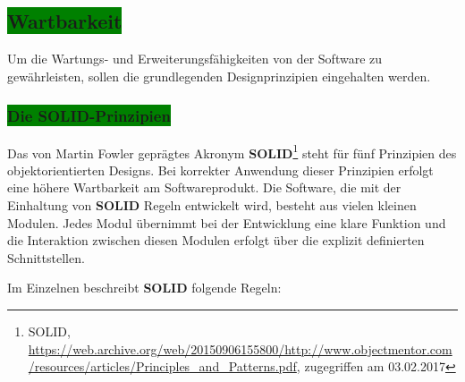 \subsection{\colorbox{green}{Wartbarkeit}}\label{maintenance}

Um die Wartungs- und Erweiterungsfähigkeiten von der Software zu gewährleisten, sollen die grundlegenden Designprinzipien eingehalten werden.

\subsubsection{\colorbox{green}{Die SOLID-Prinzipien}}\label{solid}

Das von Martin Fowler geprägtes Akronym \textbf{SOLID}\footnote{SOLID, \url{https://web.archive.org/web/20150906155800/http://www.objectmentor.com/resources/articles/Principles_and_Patterns.pdf}, zugegriffen am 03.02.2017} steht für fünf Prinzipien des objektorientierten Designs. Bei korrekter Anwendung dieser Prinzipien erfolgt eine höhere Wartbarkeit am Softwareprodukt. Die Software, die mit der Einhaltung von \textbf{SOLID} Regeln entwickelt wird, besteht aus vielen kleinen Modulen. Jedes Modul übernimmt bei der Entwicklung eine klare Funktion und die Interaktion zwischen diesen Modulen erfolgt über die explizit definierten Schnittstellen.

Im Einzelnen beschreibt \textbf{SOLID} folgende Regeln:


